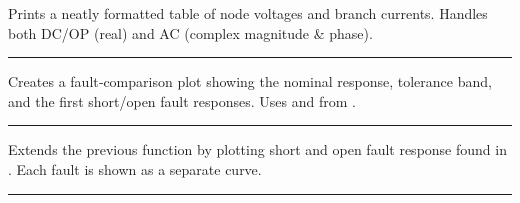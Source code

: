 \documentclass[letterpaper,10pt,english]{sphinxmanual}
\begin{document}
\begin{fulllineitems}
\label{\detokenize{plotting:print_solution}}
\pysigstartsignatures
\pysiglinewithargsret
{}
{}
{}
\pysigstopsignatures
\sphinxAtStartPar
Prints a neatly formatted table of node voltages and branch currents.
Handles both DC/OP (real) and AC (complex magnitude \& phase).

\end{fulllineitems}



\bigskip\hrule\bigskip



\begin{fulllineitems}

\pysigstartsignatures
\pysigline
{}
\pysigline
{}
\pysigline
{}
\pysigline
{}
\pysigstopsignatures
\sphinxAtStartPar
Creates a fault‑comparison plot showing the nominal response, tolerance band,
and the first short/open fault responses.  Uses  and
 from .

\end{fulllineitems}



\bigskip\hrule\bigskip



\begin{fulllineitems}

\pysigstartsignatures
\pysigline
{}
\pysigline
{}
\pysigline
{}
\pysigline
{}
\pysigstopsignatures
\sphinxAtStartPar
Extends the previous function by plotting  short and open fault
response found in .  Each fault is shown as a separate curve.

\end{fulllineitems}



\bigskip\hrule\bigskip
\end{document}
